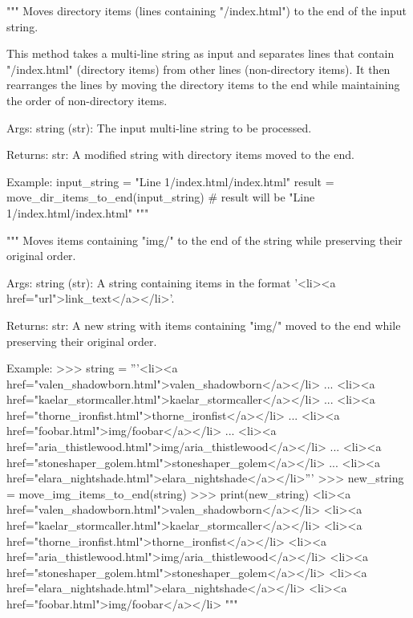 \begin{codebox}
"""
Moves directory items (lines containing "/index.html") to the end of the input string.

This method takes a multi-line string as input and separates lines that contain "/index.html"
(directory items) from other lines (non-directory items). It then rearranges the lines by moving
the directory items to the end while maintaining the order of non-directory items.

Args:
	string (str): The input multi-line string to be processed.

Returns:
	str: A modified string with directory items moved to the end.

Example:
	input_string = "Line 1\n/index.html\n/index.html"
	result = move_dir_items_to_end(input_string)
	# result will be "Line 1\n/index.html\n/index.html"
"""
\end{codebox}


\begin{codebox}
"""
Moves items containing "img/" to the end of the string while preserving their original order.

Args:
	string (str): A string containing items in the format '<li><a href="url">link_text</a></li>'.

Returns:
	str: A new string with items containing "img/" moved to the end while preserving their original order.

Example:
	>>> string = '''<li><a href="valen_shadowborn.html">valen_shadowborn</a></li>
	...            <li><a href="kaelar_stormcaller.html">kaelar_stormcaller</a></li>
	...            <li><a href="thorne_ironfist.html">thorne_ironfist</a></li>
	...            <li><a href="foobar.html">img/foobar</a></li>
	...            <li><a href="aria_thistlewood.html">img/aria_thistlewood</a></li>
	...            <li><a href="stoneshaper_golem.html">stoneshaper_golem</a></li>
	...            <li><a href="elara_nightshade.html">elara_nightshade</a></li>'''
	>>> new_string = move_img_items_to_end(string)
	>>> print(new_string)
	<li><a href="valen_shadowborn.html">valen_shadowborn</a></li>
	<li><a href="kaelar_stormcaller.html">kaelar_stormcaller</a></li>
	<li><a href="thorne_ironfist.html">thorne_ironfist</a></li>
	<li><a href="aria_thistlewood.html">img/aria_thistlewood</a></li>
	<li><a href="stoneshaper_golem.html">stoneshaper_golem</a></li>
	<li><a href="elara_nightshade.html">elara_nightshade</a></li>
	<li><a href="foobar.html">img/foobar</a></li>
"""
\end{codebox}



